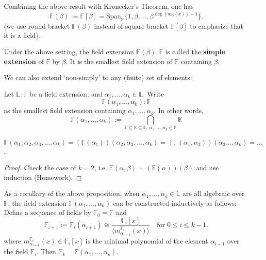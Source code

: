 Combining the above result with Kronecker's Theorem, one has
$$\mathbb{F}(\beta) := \mathbb{F}[\beta] = \mathrm{Span}_{\mathbb{F}}\{1,\beta,\dots, \beta^{\deg(m_{\beta}(x))-1}\}.$$
(we use round bracket $\mathbb{F}(\beta)$ instead of square bracket $\mathbb{F}[\beta] $ to emphasize that it is a field).

\begin{definition}
Under the above setting, the field extension 
$\mathbb{F}(\beta): \mathbb{F}$
is called the \textbf{simple extension} of $\mathbb{F}$ by $\beta$. It is the smallest field extension of $\mathbb{F}$ containing $\beta$.
\end{definition}


We can also extend `non-simply' to any (finite) set of elements:
\begin{definition}
Let $\mathbb{L}:\mathbb{F}$ be a field extension, and $\alpha_1, \dots, \alpha_k \in \mathbb{L}$. Write 
$$\mathbb{F}(\alpha_1, \dots, \alpha_k): \mathbb{F}$$ 
as the smallest field extension containing $\alpha_1, \dots, \alpha_k$. In other words,
\[ \mathbb{F}(\alpha_1, \dots, \alpha_k) := \bigcap_{\mathbb{F} \subseteq \mathbb{K} \subseteq \mathbb{L}, \ \alpha_1, \dots, \alpha_k \in \mathbb{K}} \mathbb{K} \]
\end{definition}

\begin{proposition}
$\mathbb{F}(\alpha_1, \alpha_2, \alpha_3, \dots, \alpha_k) = (\mathbb{F}(\alpha_1))(\alpha_2, \alpha_3,\dots, \alpha_k) = (\mathbb{F}(\alpha_1,\alpha_2))(\alpha_3 \dots, \alpha_k) = \dots $.
\end{proposition}
\begin{proof}
Check the case of $k = 2$, i.e. $\mathbb{F}(\alpha,\beta) = (\mathbb{F}(\alpha))(\beta)$ and use induction (Homework).
\end{proof}

As a corollary of the above proposition, when $\alpha_1, \dots, \alpha_k \in \mathbb{L}$ are all algebraic over $\mathbb{F}$, the field extension $\mathbb{F}(\alpha_1, \dots, \alpha_k)$ can be constructed inductively as follows:
Define a sequence of fields by $\mathbb{F}_0 = \mathbb{F}$ and
\[ \mathbb{F}_{i+1} := \mathbb{F}_i(\alpha_{i+1}) \cong \frac{\mathbb{F}_i[x]}{\langle m^{\mathbb{F}_i}_{\alpha_{i+1}}(x) \rangle} \quad \text{for } 0 \le i \le k-1. \]
where $m^{\mathbb{F}_i}_{\alpha_{i+1}}(x) \in \mathbb{F}_i[x]$ is the minimal polynomial of the element $\alpha_{i+1}$ over the field $\mathbb{F}_i$. Then $\mathbb{F}_k = \mathbb{F}(\alpha_1, \dots, \alpha_k)$.

